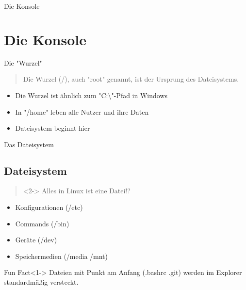 
\begin{frame}{Die Konsole}
    \section{Die Konsole}\label{sec:die-konsole}
\end{frame}

\begin{frame}{Die "Wurzel"}
    \pause

    \begin{quote}
        Die Wurzel (/), auch "root" genannt, ist der Ursprung des Dateisystems.
    \end{quote}
    \pause

    \begin{itemize}
        \item Die Wurzel ist ähnlich zum "C:\textbackslash"-Pfad in Windows\pause
        \item In "/home" leben alle Nutzer und ihre Daten\pause
        \item Dateisystem beginnt hier
    \end{itemize}

\end{frame}

\begin{frame}{Das Dateisystem}
    \subsection{Dateisystem}\label{subsec:dateisystem}

    \begin{quote}<2->
        Alles in Linux ist eine Datei!?
    \end{quote}


    \begin{itemize}
        \item<3-> Konfigurationen (/etc)
        \item<4-> Commands (/bin)
        \item<5-> Geräte (/dev)
        \item<6-> Speichermedien (/media /mnt)
    \end{itemize}

    \vspace{0.5cm}
    \begin{exampleblock}{Fun Fact}<1->
        Dateien mit Punkt am Anfang (.bashrc .git) werden im Explorer standardmäßig versteckt.
    \end{exampleblock}
\end{frame}

